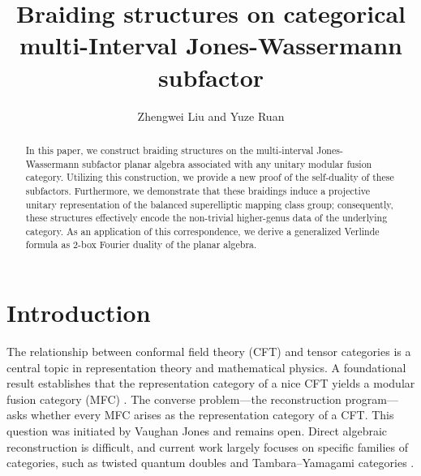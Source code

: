 \documentclass{amsart}
\begin{document}
\title{Braiding structures on categorical multi-Interval Jones-Wassermann subfactor}
\author{Zhengwei Liu and Yuze Ruan}
\address{Z. LIU, Yau Mathematical Sciences Center and Department of Mathematics, Tsinghua University, Beijing, 100084, China}
\address{Yanqi Lake Beijing Institute of Mathematical Sciences and Applications, Huairou District,
Beijing, 101408, China}

\address{Y. Ruan, Yau Mathematical Sciences Center and Department of Mathematics, Tsinghua University, Beijing, 100084, China}

\begin{abstract}
 In this paper, we construct braiding structures on the multi-interval Jones-Wassermann subfactor planar algebra associated with any unitary modular fusion category. Utilizing this construction, we provide a new proof of the self-duality of these subfactors. Furthermore, we demonstrate that these braidings induce a projective unitary representation of the balanced superelliptic mapping class group; consequently, these structures effectively encode the non-trivial higher-genus data of the underlying category. As an application of this correspondence, we derive a generalized Verlinde formula as $2$-box Fourier duality of the planar algebra.  
\end{abstract}
\maketitle

\section{Introduction}
The relationship between conformal field theory (CFT) and tensor categories is a central topic in representation theory and mathematical physics. A foundational result establishes that the representation category of a nice CFT yields a modular fusion category (MFC) \cite{Hua05, KLX05}. The converse problem—the reconstruction program—asks whether every MFC arises as the representation category of a CFT. This question was initiated by Vaughan Jones \cite{Jones17} and remains open. Direct algebraic reconstruction is difficult, and current work largely focuses on specific families of categories, such as twisted quantum doubles and Tambara–Yamagami categories \cite{EG22, EG23}.
\end{document}
